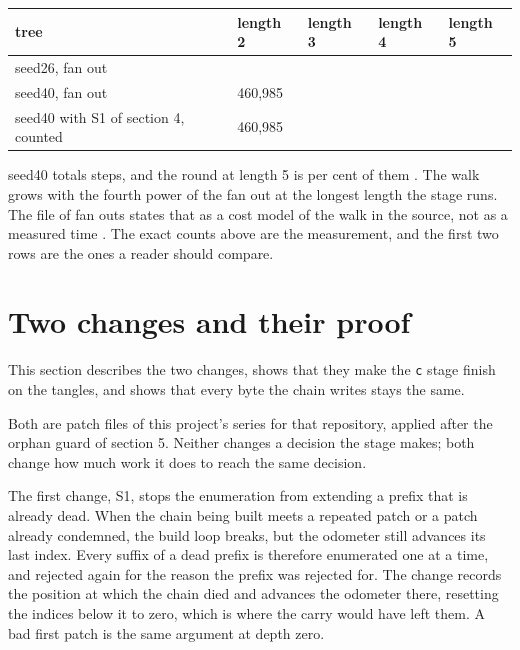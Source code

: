 \begin{table}[t]
\centering
\small
\begin{tabularx}{\textwidth}{XXXXX}
\toprule
tree & length 2 & length 3 & length 4 & length 5 \\
\midrule
seed26, fan out \FanOutSeedTwentySix{} & \StepsModelSeedTwentySixLengthTwo{} & \StepsModelSeedTwentySixLengthThree{} & \StepsModelSeedTwentySixLengthFour{} & \StepsModelSeedTwentySixLengthFive{} \\
seed40, fan out \FanOutSeedForty{} & 460,985 & \StepsModelSeedFortyLengthThree{} & \StepsModelSeedFortyLengthFour{} & \StepsModelSeedFortyLengthFive{} \\
seed40 with S1 of section 4, counted & 460,985 & \StepsPrunedSeedFortyLengthThree{} & \StepsPrunedSeedFortyLengthFour{} & \StepsPrunedSeedFortyLengthFive{} \\
\bottomrule
\end{tabularx}
\end{table}

seed40 totals \StepsModelTotalSeedForty{} steps, and the round at length 5 is \StepsShareLengthFiveSeedForty{} per cent of them {}. The walk grows with the fourth power of the fan out at the longest length the stage runs. The file of fan outs states that as a cost model of the walk in the source, not as a measured time {}. The exact counts above are the measurement, and the first two rows are the ones a reader should compare.

\section{Two changes and their proof}

This section describes the two changes, shows that they make the \texttt{c} stage finish on the tangles, and shows that every byte the chain writes stays the same.

Both are patch files of this project's series for that repository, applied after the orphan guard of section 5. Neither changes a decision the stage makes; both change how much work it does to reach the same decision.

The first change, S1, stops the enumeration from extending a prefix that is already dead. When the chain being built meets a repeated patch or a patch already condemned, the build loop breaks, but the odometer still advances its last index. Every suffix of a dead prefix is therefore enumerated one at a time, and rejected again for the reason the prefix was rejected for. The change records the position at which the chain died and advances the odometer there, resetting the indices below it to zero, which is where the carry would have left them. A bad first patch is the same argument at depth zero.

